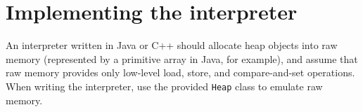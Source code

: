 \documentclass[10pt]{article}
\newcommand{\tm}[1]{\texttt{#1}}
\begin{document}
\section{Implementing the interpreter}

An interpreter written in Java or C++ should allocate heap objects
into raw memory (represented by a primitive array in Java, for example),
and assume that raw memory provides only low-level load, store, and compare-and-set operations.
When writing the interpreter, use the provided \tm{Heap} class to emulate raw memory.
\end{document}
